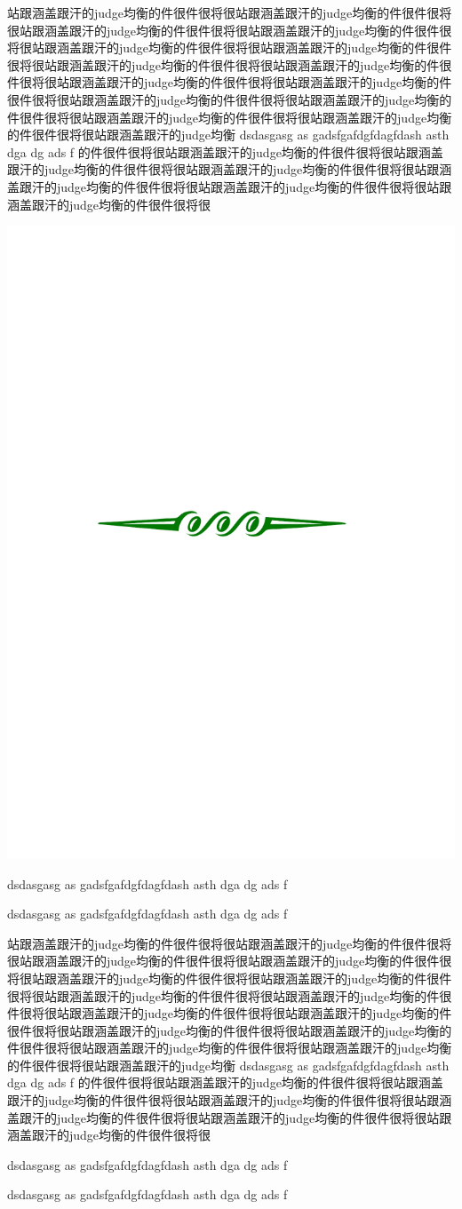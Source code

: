 \documentclass[a4paper,11pt]{book}\usepackage[]{graphicx}\usepackage[]{color}
\newcommand*{\base}[1]{
 \includegraphics[scale=0.3]{figure/greenbase.pdf}        %
 }
\begin{document}
\lipsum[1]
\lipsum[2-5]
\lipsum[6-8]


站跟涵盖跟汗的judge均衡的件很件很将很站跟涵盖跟汗的judge均衡的件很件很将很站跟涵盖跟汗的judge均衡的件很件很将很站跟涵盖跟汗的judge均衡的件很件很将很站跟涵盖跟汗的judge均衡的件很件很将很站跟涵盖跟汗的judge均衡的件很件很将很站跟涵盖跟汗的judge均衡的件很件很将很站跟涵盖跟汗的judge均衡的件很件很将很站跟涵盖跟汗的judge均衡的件很件很将很站跟涵盖跟汗的judge均衡的件很件很将很站跟涵盖跟汗的judge均衡的件很件很将很站跟涵盖跟汗的judge均衡的件很件很将很站跟涵盖跟汗的judge均衡的件很件很将很站跟涵盖跟汗的judge均衡的件很件很将很站跟涵盖跟汗的judge均衡  dsdasgasg as gadsfgafdgfdagfdash asth dga dg ads f 
的件很件很将很站跟涵盖跟汗的judge均衡的件很件很将很站跟涵盖跟汗的judge均衡的件很件很将很站跟涵盖跟汗的judge均衡的件很件很将很站跟涵盖跟汗的judge均衡的件很件很将很站跟涵盖跟汗的judge均衡的件很件很将很站跟涵盖跟汗的judge均衡的件很件很将很
 \base{}
 
  dsdasgasg as gadsfgafdgfdagfdash asth dga dg ads f 


  dsdasgasg as gadsfgafdgfdagfdash asth dga dg ads f 


站跟涵盖跟汗的judge均衡的件很件很将很站跟涵盖跟汗的judge均衡的件很件很将很站跟涵盖跟汗的judge均衡的件很件很将很站跟涵盖跟汗的judge均衡的件很件很将很站跟涵盖跟汗的judge均衡的件很件很将很站跟涵盖跟汗的judge均衡的件很件很将很站跟涵盖跟汗的judge均衡的件很件很将很站跟涵盖跟汗的judge均衡的件很件很将很站跟涵盖跟汗的judge均衡的件很件很将很站跟涵盖跟汗的judge均衡的件很件很将很站跟涵盖跟汗的judge均衡的件很件很将很站跟涵盖跟汗的judge均衡的件很件很将很站跟涵盖跟汗的judge均衡的件很件很将很站跟涵盖跟汗的judge均衡的件很件很将很站跟涵盖跟汗的judge均衡  dsdasgasg as gadsfgafdgfdagfdash asth dga dg ads f 
的件很件很将很站跟涵盖跟汗的judge均衡的件很件很将很站跟涵盖跟汗的judge均衡的件很件很将很站跟涵盖跟汗的judge均衡的件很件很将很站跟涵盖跟汗的judge均衡的件很件很将很站跟涵盖跟汗的judge均衡的件很件很将很站跟涵盖跟汗的judge均衡的件很件很将很

  dsdasgasg as gadsfgafdgfdagfdash asth dga dg ads f 


  dsdasgasg as gadsfgafdgfdagfdash asth dga dg ads f 
\end{document}
